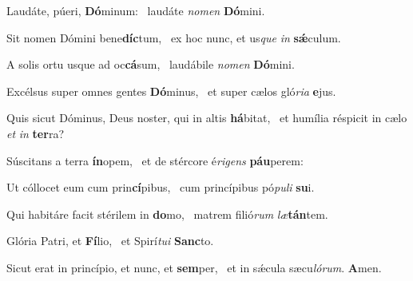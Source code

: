 \item Laudáte, púeri, \textbf{Dó}minum:~\psstar{} laudáte \textit{no}\textit{men} \textbf{Dó}mini.

\item Sit nomen Dómini bene\textbf{díc}tum,~\psstar{} ex hoc nunc, et us\textit{que} \textit{in} \textbf{sǽ}culum.

\item A solis ortu usque ad oc\textbf{cá}sum,~\psstar{} laudábile \textit{no}\textit{men} \textbf{Dó}mini.

\item Excélsus super omnes gentes \textbf{Dó}minus,~\psstar{} et super cælos gló\textit{ri}\textit{a} \textbf{e}jus.

\item Quis sicut Dóminus, Deus noster, qui in altis \textbf{há}bitat,~\psstar{} et humília réspicit in cælo \textit{et} \textit{in} \textbf{ter}ra?

\item Súscitans a terra \textbf{ín}opem,~\psstar{} et de stércore é\textit{ri}\textit{gens} \textbf{páu}perem:

\item Ut cóllocet eum cum prin\textbf{cí}pibus,~\psstar{} cum princípibus pó\textit{pu}\textit{li} \textbf{su}i.

\item Qui habitáre facit stérilem in \textbf{do}mo,~\psstar{} matrem filió\textit{rum} \textit{læ}\textbf{tán}tem.

\item Glória Patri, et \textbf{Fí}lio,~\psstar{} et Spirí\textit{tu}\textit{i} \textbf{Sanc}to.

\item Sicut erat in princípio, et nunc, et \textbf{sem}per,~\psstar{} et in sǽcula sæcu\textit{ló}\textit{rum}. \textbf{A}men.
